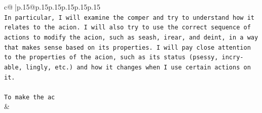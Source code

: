 \documentclass{article}
\begin{document}
{\begin{supertabular}{c@{$\;$}|p{.15\linewidth}@{}p{.15\linewidth}p{.15\linewidth}p{.15\linewidth}p{.15\linewidth}p{.15\linewidth}}
{{{\\ 
\texttt{In particular, I will examine the comper and try to understand how it relates to the acion. I will also try to use the correct sequence of actions to modify the acion, such as seash, irear, and deint, in a way that makes sense based on its properties. I will pay close attention to the properties of the acion, such as its status (psessy, incry{-}able, lingly, etc.) and how it changes when I use certain actions on it.} \\
\\ 
\texttt{To make the ac} \\
            }
        }
    }
    & \\ \\

\end{supertabular}
}
\end{document}
